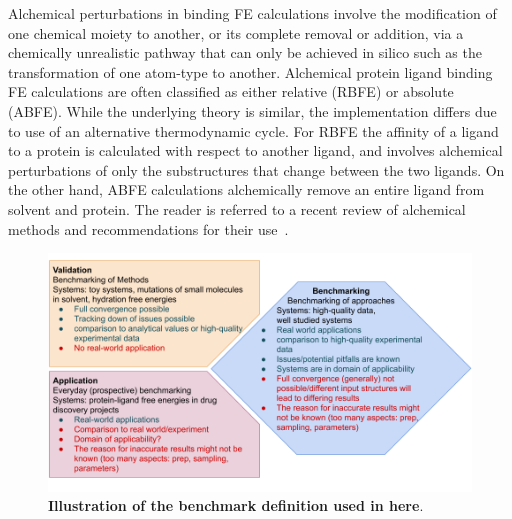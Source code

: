 \documentclass[9pt,bestpractices]{livecoms}
\begin{document}
Alchemical perturbations in binding FE calculations involve the modification of one chemical moiety to another, or its complete removal or addition, via a chemically unrealistic pathway that can only be achieved in silico such as the transformation of one atom-type to another. Alchemical protein ligand binding FE calculations are often classified as either relative (RBFE) or absolute (ABFE). While the underlying theory is similar, the implementation differs due to use of an alternative thermodynamic cycle. For RBFE the affinity of a ligand to a protein is calculated with respect to another ligand, and involves alchemical perturbations of only the substructures that change between the two ligands. On the other hand, ABFE calculations alchemically remove an entire ligand from solvent and protein. The reader is referred to a recent review of alchemical methods and recommendations for their use~\cite{meyBestPracticesAlchemical2020}.


\begin{figure}
    \includegraphics[width=0.95\linewidth]{figures/introduction/benchmarking_definition.png}
    \caption{\textbf{Illustration of the benchmark definition used in here}.}
    \label{fig:benchmarking_definition}
\end{figure}
\end{document}
